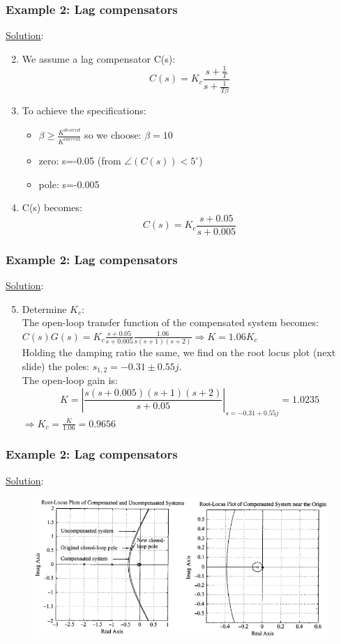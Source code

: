 \begin{frame}
	\frametitle{Example 2: Lag compensators}
	\underline{Solution}:
	\begin{enumerate}
		\setcounter{enumi}{1}
		\item We assume a lag compensator C(s): $$C(s)=K_c\frac{s+\frac{1}{T}}{s+\frac{1}{T\beta}}$$
		\item To achieve the specifications: 
		\begin{itemize}
			\item $\beta\geq\frac{K^{desired}}{K^{current}}$ so we choose: $\beta=10$
			\item zero: s=-0.05 (from $\angle(C(s))<5^{\circ}$)
			\item pole: s=-0.005
		\end{itemize}
		\item C(s) becomes: 
		$$C(s)=K_c\frac{s+0.05}{s+0.005}$$
	\end{enumerate}
\end{frame}

\begin{frame}
	\frametitle{Example 2: Lag compensators}
	\underline{Solution}:
	\begin{enumerate}
		\setcounter{enumi}{4}
		\item Determine $K_c$:\\
		The open-loop transfer function of the compensated system becomes:\\
		$C(s)G(s)=K_c\frac{s+0.05}{s+0.005}\frac{1.06}{s(s+1)(s+2)} \Rightarrow K=1.06K_c$\\
		Holding the damping ratio the same, we find on the root locus plot (next slide) the poles: $s_{1,2}=-0.31\pm0.55j$.\\
		The open-loop gain is:
		$$K=|\frac{s(s+0.005)(s+1)(s+2)}{s+0.05}|_{s=-0.31+0.55j}=1.0235$$
		$\Rightarrow K_c=\frac{K}{1.06}=0.9656$
	\end{enumerate}
\end{frame}

\begin{frame}
	\frametitle{Example 2: Lag compensators}
	\underline{Solution}:
			\begin{figure}
				\centering
				\includegraphics[width=1\linewidth]{Ex2_rootlocusnew}
			\end{figure}
\end{frame}


